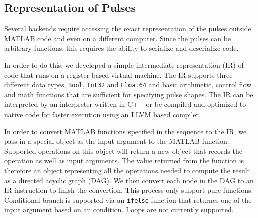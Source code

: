 \subsection{Representation of Pulses}
Several backends require accessing the exact representation of the pulses
outside MATLAB code and even on a different computer.
Since the pulses can be arbitrary functions,
this requires the ability to serialize and deserialize code.

In order to do this, we developed a simple intermediate representation (IR)
of code that runs on a register-based virtual machine.
The IR supports three different data types, \verb`Bool`, \verb`Int32` and \verb`Float64`
and basic arithmetic, control flow and math functions
that are sufficient for specifying pulse shapes.
The IR can be interpreted by an interpreter written in C++ or
be compiled and optimized to native code for faster execution using an LLVM based compiler.

In order to convert MATLAB functions specified in the sequence to the IR,
we pass in a special object as the input argument to the MATLAB function.
Supported operations on this object will return a new object
that records the operation as well as input arguments.
The value returned from the function is therefore an object representing
all the operations needed to compute the result as a directed acyclic graph (DAG).
We then convert each node in the DAG to an IR instruction to finish the convertion.
This process only support pure functions.
Conditional branch is supported via an \verb`ifelse` function
that returnes one of the input argument based on an condition.
Loops are not currently supported.


